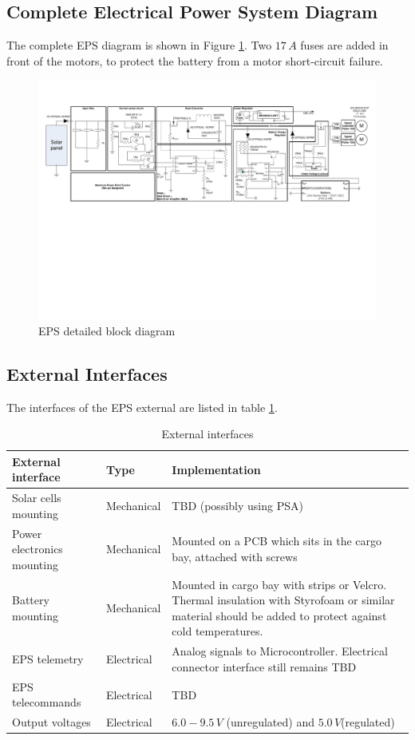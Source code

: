 \subsection{Complete Electrical Power System Diagram}
%
The complete \ac{EPS} diagram is shown in Figure \ref{fig:EPS_diagram_detailed}. Two $17\,A$ fuses are added in front of the motors, to protect the battery from a motor short-circuit failure.
%
\begin{figure}
\centering
\includegraphics[scale=0.8]{figures/fig_CDR_EPSdiagram_detailed}
\caption{EPS detailed block diagram}
\label{fig:EPS_diagram_detailed}
\end{figure}

%
\subsection{External Interfaces}
%
The interfaces of the \ac{EPS} external are listed in table \ref{tab:external_interfaces}.
%
\begin{table}[H]
\centering
\caption{External interfaces}
\label{tab:external_interfaces}
\begin{tabular}{m{}m{}m{}}
\hline
\textbf{External interface} & \textbf{Type} & \textbf{Implementation}\\
\hline
Solar cells mounting & Mechanical & \ac{TBD} (possibly using \ac{PSA})\\[2mm]
Power electronics mounting & Mechanical & Mounted on a \ac{PCB} which sits in the cargo bay, attached with screws\\[2mm]
Battery mounting & Mechanical & Mounted in cargo bay with strips or Velcro. Thermal insulation with Styrofoam or similar material should be added to protect against cold temperatures.\\[2mm]
\ac{EPS} telemetry & Electrical & Analog signals to Microcontroller. Electrical connector interface still remains \ac{TBD}\\[2mm]
\ac{EPS} telecommands & Electrical & \ac{TBD}\\[2mm]
Output voltages & Electrical & $6.0-9.5\,V$ (unregulated) and $5.0\,V$(regulated)\\[2mm]
\hline
\end{tabular}
\end{table}
%
%
